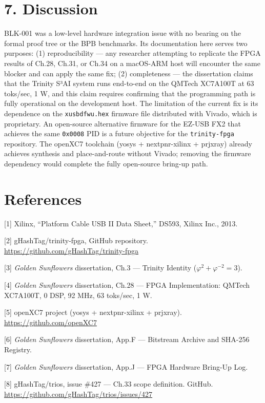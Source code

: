 \section{7. Discussion}\label{fa_33:discussion}

BLK-001 was a low-level hardware integration issue
with no bearing on the formal proof tree or the
BPB benchmarks. Its documentation here serves two
purposes: (1) reproducibility --- any researcher
attempting to replicate the FPGA results of Ch.28,
Ch.31, or Ch.34 on a macOS-ARM host will encounter
the same blocker and can apply the same fix; (2)
completeness --- the dissertation claims that the
Trinity S³AI system runs end-to-end on the QMTech
XC7A100T at 63 toks/sec, 1 W, and this claim
requires confirming that the programming path is
fully operational on the development host. The
limitation of the current fix is its dependence on
the \texttt{xusbdfwu.hex} firmware file
distributed with Vivado, which is proprietary. An
open-source alternative firmware for the EZ-USB
FX2 that achieves the same \texttt{0x0008} PID is
a future objective for the \texttt{trinity-fpga}
repository. The openXC7 toolchain (yosys +
nextpnr-xilinx + prjxray) already achieves
synthesis and place-and-route without Vivado;
removing the firmware dependency would complete
the fully open-source bring-up path.

\section{References}\label{fa_33:references}

[1] Xilinx, ``Platform Cable USB II Data
Sheet,'' DS593, Xilinx Inc., 2013.

[2] gHashTag/trinity-fpga, GitHub repository.
\url{https://github.com/gHashTag/trinity-fpga}

[3] \emph{Golden Sunflowers} dissertation,
Ch.3 --- Trinity Identity
(\(\varphi^2 + \varphi^{-2} = 3\)).

[4] \emph{Golden Sunflowers} dissertation,
Ch.28 --- FPGA Implementation: QMTech XC7A100T, 0
DSP, 92 MHz, 63 toks/sec, 1 W.

[5] openXC7 project (yosys + nextpnr-xilinx +
prjxray). \url{https://github.com/openXC7}

[6] \emph{Golden Sunflowers} dissertation,
App.F --- Bitstream Archive and SHA-256 Registry.

[7] \emph{Golden Sunflowers} dissertation,
App.J --- FPGA Hardware Bring-Up Log.

[8] gHashTag/trios, issue \#427 --- Ch.33
scope definition. GitHub.
\url{https://github.com/gHashTag/trios/issues/427}

